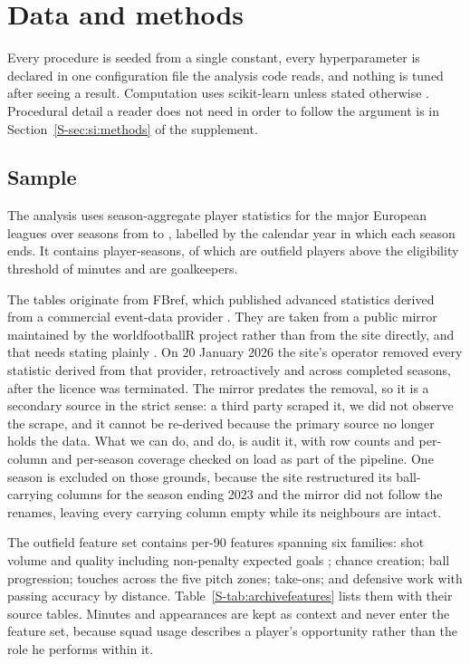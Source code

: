 \section{Data and methods}
\label{sec:methods}

Every procedure is seeded from a single constant, every hyperparameter is declared in one
configuration file the analysis code reads, and nothing is tuned after seeing a result.
Computation uses scikit-learn unless stated otherwise \citep{pedregosa2011scikit}. Procedural
detail a reader does not need in order to follow the argument is in
Section~\ref{S-sec:si:methods} of the supplement.

\subsection{Sample}
\label{sec:methods:data}

The analysis uses season-aggregate player statistics for the \ArcNLeaguesWord{} major European
leagues over \ArcNSeasonsWord{} seasons from \ArcSeasonFirst{} to \ArcSeasonLast{}, labelled by the
calendar year in which each season ends. It contains \ArcRows{} player-seasons, of which
\ArcEligible{} are outfield players above the eligibility threshold of \MinMinutes{} minutes and
\ArcKeepers{} are goalkeepers.

The tables originate from FBref, which published advanced statistics derived from a commercial
event-data provider \citep{fbref2026}. They are taken from a public mirror maintained by the
worldfootballR project rather than from the site directly, and that needs stating plainly
\citep{zivkovic2026worldfootballr}. On 20 January 2026 the site's operator removed every
statistic derived from that provider, retroactively and across completed seasons, after the
licence was terminated. The mirror predates the removal, so it is a secondary source in the
strict sense: a third party scraped it, we did not observe the scrape, and it cannot be
re-derived because the primary source no longer holds the data. What we can do, and do, is audit
it, with row counts and per-column and per-season coverage checked on load as part of the
pipeline. One season is excluded on those grounds, because the site restructured its
ball-carrying columns for the season ending 2023 and the mirror did not follow the renames,
leaving every carrying column empty while its neighbours are intact.

The outfield feature set contains \ArcFeatures{} per-90 features spanning six families: shot
volume and quality including non-penalty expected goals \citep{eggels2016explaining,
rathke2017examination}; chance creation; ball progression; touches across the five pitch zones;
take-ons; and defensive work with passing accuracy by distance.
Table~\ref{S-tab:archivefeatures} lists them with their source tables. Minutes and appearances
are kept as context and never enter the feature set, because squad usage describes a player's
opportunity rather than the role he performs within it.

